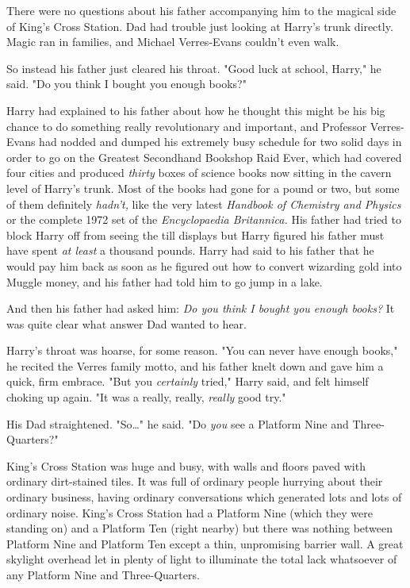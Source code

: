 There were no questions about his father accompanying him to the magical side
of King's Cross Station. Dad had trouble just looking at Harry's trunk
directly. Magic ran in families, and Michael Verres-Evans couldn't even walk.

So instead his father just cleared his throat. "Good luck at school, Harry," he
said. "Do you think I bought you enough books?"

Harry had explained to his father about how he thought this might be his big
chance to do something really revolutionary and important, and Professor
Verres-Evans had nodded and dumped his extremely busy schedule for two solid
days in order to go on the Greatest Secondhand Bookshop Raid Ever, which had
covered four cities and produced \emph{thirty} boxes of science books now
sitting in the cavern level of Harry's trunk. Most of the books had gone for a
pound or two, but some of them definitely \emph{hadn't,} like the very latest
\emph{Handbook of Chemistry and Physics} or the complete 1972 set of the
\emph{Encyclopaedia Britannica.} His father had tried to block Harry off from
seeing the till displays but Harry figured his father must have spent \emph{at
least} a thousand pounds. Harry had said to his father that he would pay him
back as soon as he figured out how to convert wizarding gold into Muggle money,
and his father had told him to go jump in a lake.

And then his father had asked him: \emph{Do you think I bought you enough
books?} It was quite clear what answer Dad wanted to hear.

Harry's throat was hoarse, for some reason. "You can never have enough books,"
he recited the Verres family motto, and his father knelt down and gave him a
quick, firm embrace. "But you \emph{certainly} tried," Harry said, and felt
himself choking up again. "It was a really, really, \emph{really} good try."

His Dad straightened. "So{\ldots}" he said. "Do \emph{you} see a Platform Nine
and Three-Quarters?"

King's Cross Station was huge and busy, with walls and floors paved with
ordinary dirt-stained tiles. It was full of ordinary people hurrying about
their ordinary business, having ordinary conversations which generated lots and
lots of ordinary noise. King's Cross Station had a Platform Nine (which they
were standing on) and a Platform Ten (right nearby) but there was nothing
between Platform Nine and Platform Ten except a thin, unpromising barrier wall.
A great skylight overhead let in plenty of light to illuminate the total lack
whatsoever of any Platform Nine and Three-Quarters.

